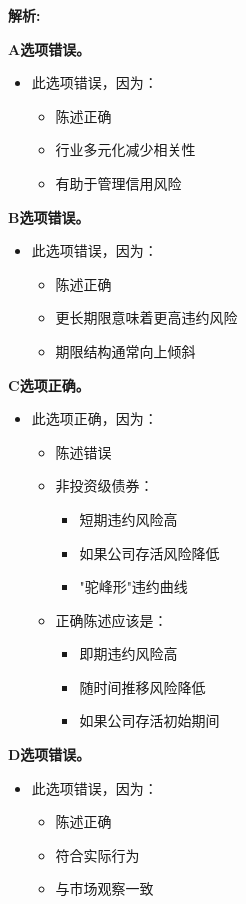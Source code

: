 \documentclass{article}
\newenvironment{explanation}
{\textbf{解析:}\par}
{\par}
\begin{document}
\begin{explanation}
    \textbf{A选项错误。}
    \begin{itemize}
        \item 此选项错误，因为：
        \begin{itemize}
            \item 陈述正确
            \item 行业多元化减少相关性
            \item 有助于管理信用风险
        \end{itemize}
    \end{itemize}
    \textbf{B选项错误。}
    \begin{itemize}
        \item 此选项错误，因为：
        \begin{itemize}
            \item 陈述正确
            \item 更长期限意味着更高违约风险
            \item 期限结构通常向上倾斜
        \end{itemize}
    \end{itemize}
    \textbf{C选项正确。}
    \begin{itemize}
        \item 此选项正确，因为：
        \begin{itemize}
            \item 陈述错误
            \item 非投资级债券：
            \begin{itemize}
                \item 短期违约风险高
                \item 如果公司存活风险降低
                \item "驼峰形"违约曲线
            \end{itemize}
            \item 正确陈述应该是：
            \begin{itemize}
                \item 即期违约风险高
                \item 随时间推移风险降低
                \item 如果公司存活初始期间
            \end{itemize}
        \end{itemize}
    \end{itemize}
    \textbf{D选项错误。}
    \begin{itemize}
        \item 此选项错误，因为：
        \begin{itemize}
            \item 陈述正确
            \item 符合实际行为
            \item 与市场观察一致
        \end{itemize}
    \end{itemize}
\end{explanation}
\end{document}

